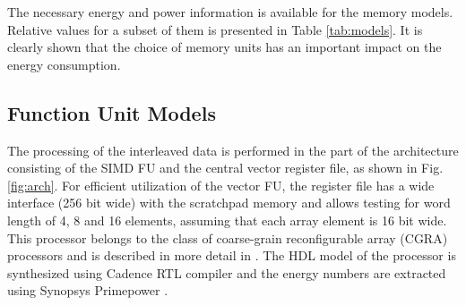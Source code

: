 \documentclass[prodmode,acmtecs]{acmsmall}
\begin{document}
The necessary energy and power information is available for the memory models. Relative values for a subset of them is presented in Table \ref{tab:models}. 
It is clearly shown that the choice of memory units has an important impact on the energy consumption.

\begin{table}
\begin{tabnote}%
\end{tabnote}%
\end{table}

\subsection{Function Unit Models}

The processing of the interleaved data is performed in the part of the architecture consisting of the SIMD FU and the central vector register file, as shown in Fig.\ref{fig:arch}.
For efficient utilization of the vector FU, the register file has a wide interface (256 bit wide) with the scratchpad memory and allows testing for word length of 4, 8 and 16 elements, assuming that each array element is 16 bit wide.  
This processor belongs to the class of coarse-grain reconfigurable array (CGRA) processors and is described in more detail in \cite{lee2003compilation}.
The HDL model of the processor is synthesized using Cadence RTL compiler \cite{cadencecompiler} and the energy numbers are extracted using Synopsys Primepower \cite{kai2003synopsys}.
\end{document}

